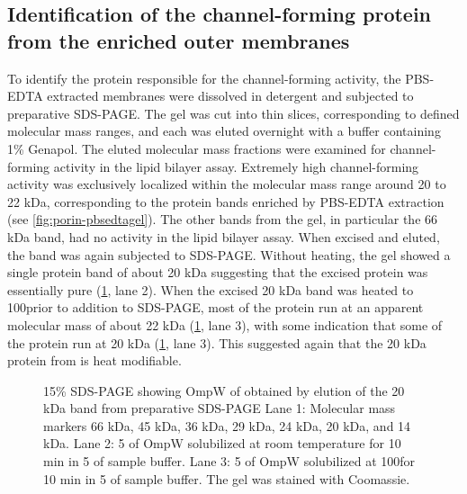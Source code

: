 \subsection{Identification of the channel-forming protein from the enriched outer membranes} 
To identify the protein responsible for the channel-forming activity, the \ac{PBS}-\ac{EDTA} extracted membranes were dissolved in detergent and subjected to preparative \ac{SDS-PAGE}. The gel was cut into thin slices, corresponding to defined molecular mass ranges, and each was eluted overnight with a buffer containing 1\% Genapol. The eluted molecular mass fractions were examined for channel-forming activity in the lipid bilayer assay. Extremely high channel-forming activity was exclusively localized within the molecular mass range around 20 to 22 kDa, corresponding to the protein bands enriched by \ac{PBS}-\ac{EDTA} extraction (see \cref{fig:porin-pbsedtagel}). The other bands from the gel, in particular the 66 kDa band, had no activity in the lipid bilayer assay. When excised and eluted, the band was again subjected to \ac{SDS-PAGE}. Without heating, the gel showed a single protein band of about 20 kDa suggesting that the excised protein was essentially pure (\cref{fig:porin-elutedband}, lane 2). When the excised 20 kDa band was heated to 100\cel prior to addition to \ac{SDS-PAGE}, most of the protein run at an apparent molecular mass of about 22 kDa (\cref{fig:porin-elutedband}, lane 3), with some indication that some of the protein run at 20 kDa (\cref{fig:porin-elutedband}, lane 3). This suggested again that the 20 kDa protein from \caulobacter is heat modifiable.

\begin{figure}[htb]
  	\begin{center}
   	\end{center}
   	\caption[\ac{SDS-PAGE} showing OmpW from \caulobacter obtained by elution of the 20 kDa band]{
15\% \ac{SDS-PAGE} showing OmpW of \caulobacter obtained by elution of the 20 kDa band from preparative \ac{SDS-PAGE} Lane 1: Molecular mass markers 66 kDa, 45 kDa, 36 kDa, 29 kDa, 24 kDa, 20 kDa, and 14 kDa. Lane 2: 5 \microgram of OmpW solubilized at room temperature for 10 min in 5 \microlitre of sample buffer. Lane 3: 5 \microgram of OmpW solubilized at 100\cel for 10 min in 5 \microlitre of sample buffer. The gel was stained with Coomassie.
   	}
   	\label{fig:porin-elutedband}
\end{figure}   

